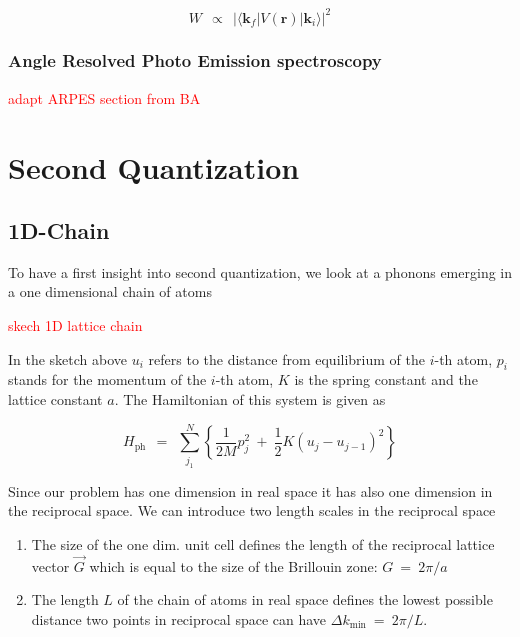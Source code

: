 \documentclass[10pt]{report}
\numberwithin{equation}{chapter}
\newcommand{\vc}[1]{ %
  \mathbf{#1}
}
\begin{document}
\begin{equation}
  W ~~\propto~~ | \langle \vc{k}_f | V(\vc{r}) | \vc{k}_i \rangle |^2
\end{equation}


\subsection{Angle Resolved Photo Emission spectroscopy}


\textcolor{red}{adapt ARPES section from BA}









%

\chapter{Second Quantization}

\section{1D-Chain}

To have a first insight into second quantization, we look at a phonons emerging in a one dimensional chain of atoms

\textcolor{red}{skech 1D lattice chain}


In the sketch above $u_i$ refers to the distance from equilibrium of the $i$-th atom, $p_i$ stands for the momentum of the $i$-th atom, $K$ is the spring constant and the lattice constant $a$.
The Hamiltonian of this system is given as

\begin{equation} \label{eq:ham_phonon_chain}
  H_\text{ph} ~~=~~ \sum_{j_1}^N \left\{ \frac{1}{2M} p_j^2 ~+~ \frac{1}{2} K (u_j - u_{j-1})^2 \right\}
\end{equation}

Since our problem has one dimension in real space it has also one dimension in the reciprocal space. We can introduce two length scales in the reciprocal space

\begin{enumerate}
  \item{The size of the one dim. unit cell defines the length of the reciprocal lattice vector $\vec{G}$ which is equal to the size of the Brillouin zone: $ G ~=~ 2\pi/a$}
  \item{The length $L$ of the chain of atoms in real space defines the lowest possible distance two points in reciprocal space can have $\Delta k_\text{min} ~=~ 2\pi/L$.}
\end{enumerate}
\end{document}

